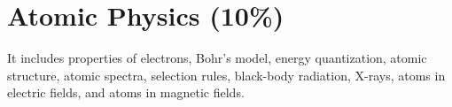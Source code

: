 
\section{Atomic Physics (10\%)}

It includes properties of electrons, Bohr's model, energy quantization, atomic structure, atomic spectra, selection rules, black-body radiation, X-rays, atoms in electric fields, and atoms in magnetic fields.


